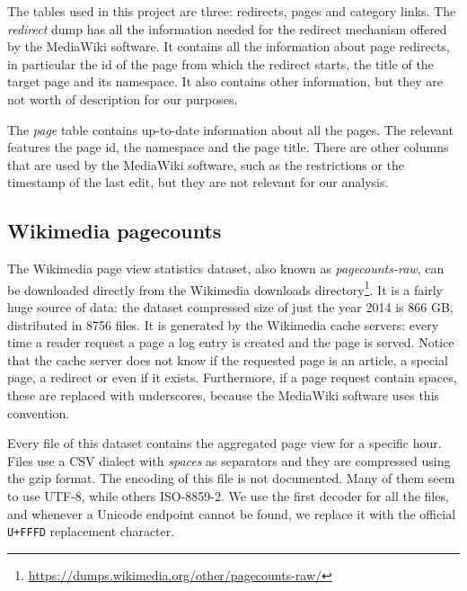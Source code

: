 The tables used in this project are three: redirects, pages and category links.
The \emph{redirect} dump has all the information needed for the redirect mechanism offered by the MediaWiki software.
It contains all the information about page redirects, in particular the id of the page from which the redirect starts, the title of the target page and its namespace.
It also contains other information, but they are not worth of description for our purposes.

The \emph{page} table contains up-to-date information about all the pages.
The relevant features the page id, the namespace and the page title.
There are other columns that are used by the MediaWiki software, such as the restrictions or the timestamp of the last edit, but they are not relevant for our analysis.


\subsection{Wikimedia pagecounts}
The Wikimedia page view statistics dataset, also known as \emph{pagecounts-raw}, can be downloaded directly from the Wikimedia downloads directory\footnote{\url{https://dumps.wikimedia.org/other/pagecounts-raw/}}.
It is a fairly huge source of data: the dataset compressed size of just the year 2014 is 866 GB, distributed in 8756 files.
It is generated by the Wikimedia cache servers: every time a reader request a page a log entry is created and the page is served.
Notice that the cache server does not know if the requested page is an article, a special page, a redirect or even if it exists.
Furthermore, if a page request contain spaces, these are replaced with underscores, because the MediaWiki software uses this convention.

Every file of this dataset contains the aggregated page view for a specific hour.
Files use a CSV dialect with \emph{spaces} as separators and they are compressed using the gzip format.
The encoding of this file is not documented.
Many of them seem to use UTF-8, while others ISO-8859-2. %
We use the first decoder for all the files, and whenever a Unicode endpoint cannot be found, we replace it with the official \texttt{U+FFFD} replacement character.

